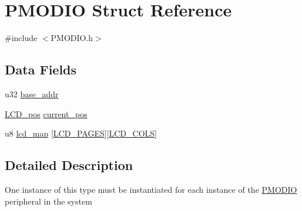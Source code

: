\hypertarget{structPMODIO}{\section{P\-M\-O\-D\-I\-O Struct Reference}
\label{structPMODIO}
}


{\ttfamily \#include $<$P\-M\-O\-D\-I\-O.\-h$>$}

\subsection*{Data Fields}
\begin{DoxyCompactItemize}
\item 
u32 \hyperlink{structPMODIO_ad427392097b1a736b78a223b9ba0b646}{base\-\_\-addr}
\item 
\hyperlink{structLCD__pos}{L\-C\-D\-\_\-pos} \hyperlink{structPMODIO_ab0badb5cd0896ea00f8c2d2c2f51a481}{current\-\_\-pos}
\item 
u8 \hyperlink{structPMODIO_aa8d4b58ef344f6624f70f8b434cd1fa0}{lcd\-\_\-map} \mbox{[}\hyperlink{PMODIO_8h_a52bb29a342e1892b197f2d2b0a705550}{L\-C\-D\-\_\-\-P\-A\-G\-E\-S}\mbox{]}\mbox{[}\hyperlink{PMODIO_8h_a0afb537ac0813a7acc2f797a4d3baa0b}{L\-C\-D\-\_\-\-C\-O\-L\-S}\mbox{]}
\end{DoxyCompactItemize}


\subsection{Detailed Description}
One instance of this type must be instantiated for each instance of the \hyperlink{structPMODIO}{P\-M\-O\-D\-I\-O} peripheral in the system 

